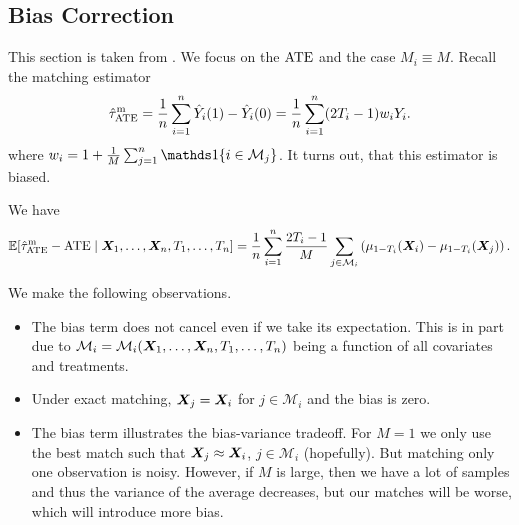 \documentclass[11pt]{exam}
\begin{document}
\subsection{Bias Correction}
This section is taken from \citet{abadie2011bias}. We focus on the $\mathrm{ATE}$ and the case $M_i \equiv M$. Recall the matching estimator
\[
     \hat \tau^\mathrm{m}_{\mathrm{ATE}} = \frac{1}{n} \sum_{i=1}^n \hat Y_i(1) - \hat Y_i(0) = \frac{1}{n} \sum_{i=1}^n (2T_i - 1) w_i Y_i.
\]
where $w_i = 1 + \frac{1}{M}\sum_{j=1}^n \indicator{i \in \mathcal{M}_j}$. It turns out, that this estimator is biased. 
\begin{lemma}
    We have
    \[
        \mathbb{E}[\hat \tau^\mathrm{m}_{\mathrm{ATE}} - \mathrm{ATE} \mid \bm{X}_1, \ldots, \bm{X}_n, T_1, \ldots, T_n] = \frac{1}{n} \sum_{i=1}^n \frac{2T_i - 1}{M} \sum_{j \in \mathcal{M}_i} \left(\mu_{1- T_i}(\bm{X}_i) - \mu_{1- T_i}(\bm{X}_j)\right).
    \]
\end{lemma}
We make the following observations.
\begin{itemize}
    \item The bias term does not cancel even if we take its expectation. This is in part due to $\mathcal{M}_i = \mathcal{M}_i(\bm{X}_1, \ldots, \bm{X}_n, T_1, \ldots, T_n)$ being a function of all covariates and treatments.
    \item Under exact matching, $\bm{X}_j = \bm{X}_i$ for $j \in \mathcal{M}_i$ and the bias is zero.
    \item The bias term illustrates the bias-variance tradeoff. For $M=1$ we only use the best match such that $\bm{X}_j \approx \bm{X}_i$, $j \in \mathcal{M}_i$ (hopefully). But matching only one observation is noisy. However, if $M$ is large, then we have a lot of samples and thus the variance of the average decreases, but our matches will be worse, which will introduce more bias.
\end{itemize}
\end{document}
